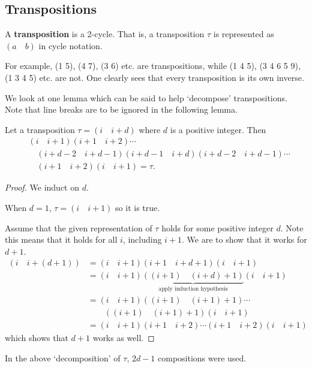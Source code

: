 \subsection{Transpositions}
\begin{definition}
    A \textbf{transposition} is a 2-cycle. That is, a transposition $\tau$ is represented as $(a\quad b)$ in cycle notation.
\end{definition}
For example, (1 5), (4 7), (3 6) etc. are transpositions, while (1 4 5), (3 4 6 5 9), (1 3 4 5) etc. are not. One clearly sees that every transposition is its own inverse.

We look at one lemma which can be said to help `decompose' transpositions. Note that line breaks are to be ignored in the following lemma.
\begin{lemma}\label{lemma-decompose-transposition}
    Let a transposition $\tau = (i\quad i+d)$ where $d$ is a positive integer. Then
    \begin{align*}
        & (i\quad i+1)(i+1\quad i+2)\cdots\\
        &\quad (i+d-2\quad i+d-1)(i+d-1\quad i+d)(i+d-2\quad i+d-1)\cdots\\
        &\quad (i+1\quad i+2)(i\quad i+1) = \tau.
    \end{align*}
\end{lemma}
\begin{proof}
    We induct on $d$.

    When $d = 1$, $\tau = (i\quad i+1)$ so it is true.

    Assume that the given representation of $\tau$ holds for some positive integer $d$. Note this means that it holds for all $i$, including $i+1$. We are to show that it works for $d + 1$.
    \begin{align*}
        (i\quad i+(d+1)) &= (i\quad i+1)(i+1\quad i+d+1)(i\quad i+1)\\
        &= (i\quad i+1)\underbrace{((i+1)\quad (i+d)+1)}_{\text{apply induction hypothesis}}(i\quad i+1)\\
        &= (i\quad i+1)((i+1)\quad(i+1)+1)\cdots\\
        &\quad\quad((i+1)\quad(i+1)+1)(i\quad i+1)\\
        &= (i\quad i+1)(i+1\quad i+2)\cdots(i+1\quad i+2)(i\quad i+1)
    \end{align*}
    which shows that $d+1$ works as well.
\end{proof}
\begin{remark}
    In the above `decomposition' of $\tau$, $2d-1$ compositions were used.
\end{remark}
